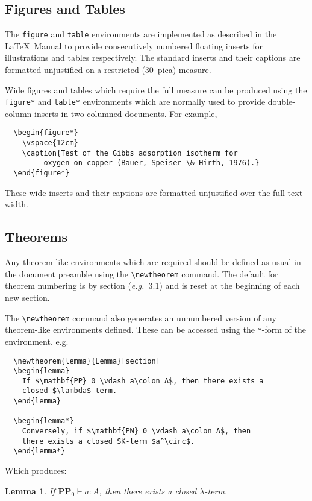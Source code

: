 \documentclass{mscs}
\newcommand\eg{\textit{e.g.\ }}
\newtheorem{lemma}{Lemma}[section]
\begin{document}
\subsection{Figures and Tables}

The \texttt{figure} and \texttt{table} environments are implemented as described
in the \LaTeX\ Manual to provide consecutively numbered floating inserts
for illustrations and tables respectively.
The standard inserts and their captions are formatted unjustified on a
restricted (30~pica) measure.

Wide figures and tables which require the full measure can
be produced using the \texttt{figure*} and \texttt{table*} environments which
are normally used to provide double-column inserts in two-columned
documents. For example,
\begin{verbatim}
  \begin{figure*}
    \vspace{12cm}
    \caption{Test of the Gibbs adsorption isotherm for
         oxygen on copper (Bauer, Speiser \& Hirth, 1976).}
  \end{figure*}
\end{verbatim}
These wide inserts and their captions are formatted unjustified over the
full text width.

\subsection{Theorems}

Any theorem-like environments which are required should be defined
as usual in the document preamble using the \verb"\newtheorem" command.
The default for theorem numbering is by section (\eg 3.1) and is
reset at the beginning of each new section.

The \verb"\newtheorem" command also generates an unnumbered version of
any theorem-like environments defined. These can be accessed using the
\verb"*"-form of the environment. e.g.
\begin{verbatim}
  \newtheorem{lemma}{Lemma}[section]
  \begin{lemma}
    If $\mathbf{PP}_0 \vdash a\colon A$, then there exists a
    closed $\lambda$-term.
  \end{lemma}

  \begin{lemma*}
    Conversely, if $\mathbf{PN}_0 \vdash a\colon A$, then
    there exists a closed SK-term $a^\circ$.
  \end{lemma*}
\end{verbatim}
Which produces:
  \begin{lemma}
    If $\mathbf{PP}_0 \vdash a\colon A$, then there exists a
    closed $\lambda$-term.
  \end{lemma}
\end{document}
